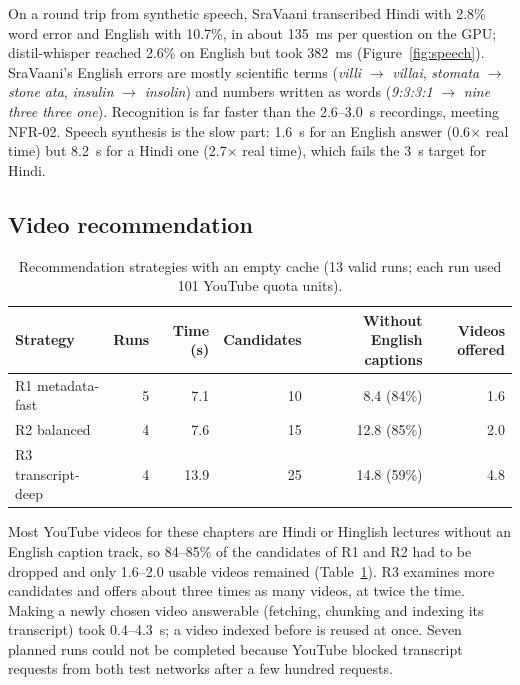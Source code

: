 On a round trip from synthetic speech, SraVaani transcribed Hindi with 2.8\% word error and English with
10.7\%, in about 135~ms per question on the GPU; distil-whisper reached 2.6\% on English but took 382~ms
(Figure~\ref{fig:speech}). SraVaani's English errors are mostly scientific terms (\emph{villi}
$\rightarrow$ \emph{villai}, \emph{stomata} $\rightarrow$ \emph{stone ata}, \emph{insulin} $\rightarrow$
\emph{insolin}) and numbers written as words (\emph{9:3:3:1} $\rightarrow$ \emph{nine three three one}).
Recognition is far faster than the 2.6--3.0~s recordings, meeting NFR-02. Speech synthesis is the slow
part: 1.6~s for an English answer (0.6$\times$ real time) but 8.2~s for a Hindi one (2.7$\times$ real
time), which fails the 3~s target for Hindi.

\subsection{Video recommendation}
\label{sec:res-video}

\begin{table}[htbp]
  \centering
  \caption{Recommendation strategies with an empty cache (13 valid runs; each run used 101 YouTube quota
    units).}
  \label{tab:video}
  \begin{tabular}{lrrrrr}
    \toprule
    Strategy & Runs & Time (s) & Candidates & Without English captions & Videos offered \\
    \midrule
    R1 metadata-fast & 5 & 7.1 & 10 & 8.4 (84\%) & 1.6 \\
    R2 balanced & 4 & 7.6 & 15 & 12.8 (85\%) & 2.0 \\
    R3 transcript-deep & 4 & 13.9 & 25 & 14.8 (59\%) & 4.8 \\
    \bottomrule
  \end{tabular}
\end{table}

Most YouTube videos for these chapters are Hindi or Hinglish lectures without an English caption track,
so 84--85\% of the candidates of R1 and R2 had to be dropped and only 1.6--2.0 usable videos remained
(Table~\ref{tab:video}). R3 examines more candidates and offers about three times as many videos, at
twice the time. Making a newly chosen video answerable (fetching, chunking and indexing its transcript)
took 0.4--4.3~s; a video indexed before is reused at once. Seven planned runs could not be completed
because YouTube blocked transcript requests from both test networks after a few hundred requests.

